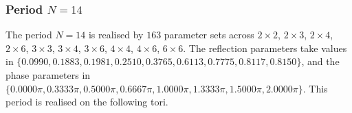 \par
\subsubsection{Period $N = 14$}
The period $N=14$ is realised by $163$ parameter sets across $2\times2$, $2\times3$, $2\times4$, $2\times6$, $3\times3$, $3\times4$, $3\times6$, $4\times4$, $4\times6$, $6\times6$. The reflection parameters take values in $\{0.0990, 0.1883, 0.1981, 0.2510, 0.3765, 0.6113, 0.7775, 0.8117, 0.8150\}$, and the phase parameters in $\{0.0000\pi, 0.3333\pi, 0.5000\pi, 0.6667\pi, 1.0000\pi, 1.3333\pi, 1.5000\pi, 2.0000\pi\}$. This period is realised on the following tori.
